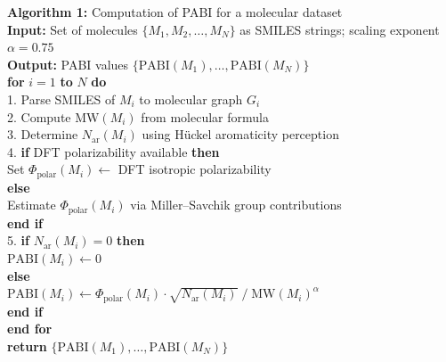 \documentclass[12pt,a4paper]{article}
\begin{document}
\begin{framed}
\noindent\textbf{Algorithm 1:} Computation of PABI for a molecular dataset\\[0.3em]
\label{alg:pabi}
\textbf{Input:} Set of molecules $\{M_1, M_2, \ldots, M_N\}$ as SMILES strings; scaling exponent $\alpha = 0.75$\\
\textbf{Output:} PABI values $\{\text{PABI}(M_1), \ldots, \text{PABI}(M_N)\}$\\[0.3em]
\textbf{for} $i = 1$ \textbf{to} $N$ \textbf{do}\\
\hspace*{1em}1. Parse SMILES of $M_i$ to molecular graph $G_i$\\
\hspace*{1em}2. Compute $\text{MW}(M_i)$ from molecular formula\\
\hspace*{1em}3. Determine $N_{\text{ar}}(M_i)$ using H\"{u}ckel aromaticity perception\\
\hspace*{1em}4. \textbf{if} DFT polarizability available \textbf{then}\\
\hspace*{2em}Set $\Phi_{\text{polar}}(M_i) \leftarrow$ DFT isotropic polarizability\\
\hspace*{1em}\textbf{else}\\
\hspace*{2em}Estimate $\Phi_{\text{polar}}(M_i)$ via Miller--Savchik group contributions\\
\hspace*{1em}\textbf{end if}\\
\hspace*{1em}5. \textbf{if} $N_{\text{ar}}(M_i) = 0$ \textbf{then}\\
\hspace*{2em}$\text{PABI}(M_i) \leftarrow 0$\\
\hspace*{1em}\textbf{else}\\
\hspace*{2em}$\text{PABI}(M_i) \leftarrow \Phi_{\text{polar}}(M_i) \cdot \sqrt{N_{\text{ar}}(M_i)} \;/\; \text{MW}(M_i)^{\alpha}$\\
\hspace*{1em}\textbf{end if}\\
\textbf{end for}\\[0.3em]
\textbf{return} $\{\text{PABI}(M_1), \ldots, \text{PABI}(M_N)\}$
\end{framed}
\end{document}
